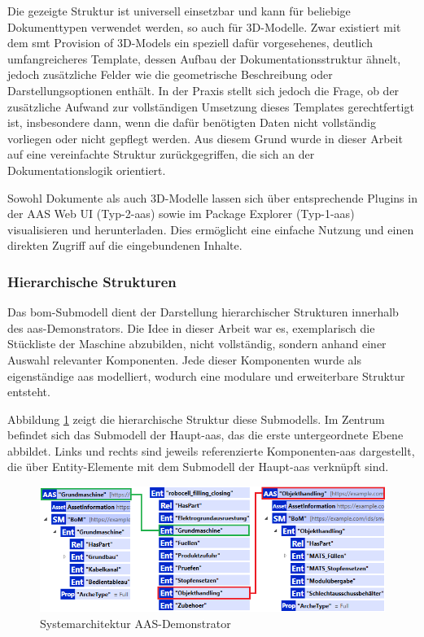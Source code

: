 Die gezeigte Struktur ist universell einsetzbar und kann für beliebige Dokumenttypen verwendet werden, so auch für 3D-Modelle.
Zwar existiert mit dem \acs{smt} Provision of 3D-Models \cite{Spezifikation3DModelle} ein speziell dafür vorgesehenes, deutlich umfangreicheres Template, dessen Aufbau der Dokumentationsstruktur ähnelt, jedoch zusätzliche Felder wie die geometrische Beschreibung oder Darstellungsoptionen enthält.
In der Praxis stellt sich jedoch die Frage, ob der zusätzliche Aufwand zur vollständigen Umsetzung dieses Templates gerechtfertigt ist, insbesondere dann, wenn die dafür benötigten Daten nicht vollständig vorliegen oder nicht gepflegt werden.
Aus diesem Grund wurde in dieser Arbeit auf eine vereinfachte Struktur zurückgegriffen, die sich an der Dokumentationslogik orientiert.

Sowohl Dokumente als auch 3D-Modelle lassen sich über entsprechende Plugins in der AAS Web UI (Typ-2-\acs{aas}) sowie im Package Explorer (Typ-1-\acs{aas}) visualisieren und herunterladen.
Dies ermöglicht eine einfache Nutzung und einen direkten Zugriff auf die eingebundenen Inhalte.

\subsubsection*{Hierarchische Strukturen}
\vspace{-0.5em}
Das \acs{bom}-Submodell dient der Darstellung hierarchischer Strukturen innerhalb des \acs{aas}-Demonstrators.
Die Idee in dieser Arbeit war es, exemplarisch die Stückliste der Maschine abzubilden, nicht vollständig, sondern anhand einer Auswahl relevanter Komponenten.
Jede dieser Komponenten wurde als eigenständige \acs{aas} modelliert, wodurch eine modulare und erweiterbare Struktur entsteht.

Abbildung \ref{fig:BOM} zeigt die hierarchische Struktur diese Submodells.
Im Zentrum befindet sich das Submodell der Haupt-\acs{aas}, das die erste untergeordnete Ebene abbildet.
Links und rechts sind jeweils referenzierte Komponenten-\acs{aas} dargestellt, die über Entity-Elemente mit dem Submodell der Haupt-\acs{aas} verknüpft sind.

\begin{figure}[htbp]
    \centering
        \includegraphics[width=1\textwidth]{Bilder/Ergebnisse/StatischeDaten/BOM.png}
    \caption{Systemarchitektur AAS-Demonstrator}
    \label{fig:BOM}
\end{figure}


